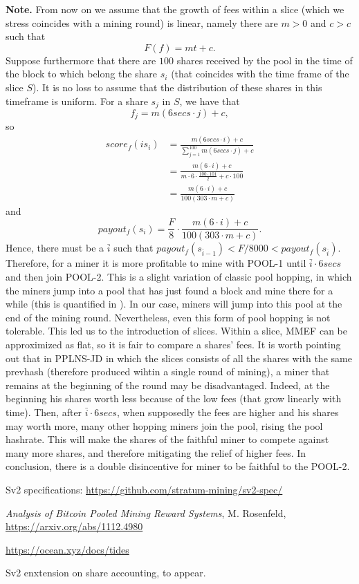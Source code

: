 \documentclass[11pt]{article} %
\begin{document}
\textbf{Note.} From now on we assume that the growth of fees within a slice (which we stress coincides with a mining round) is linear, namely there are $m>0$ and $c>c$ such that 
\[F(f) = mt+c.\]
Suppose furthermore that there are $100$ shares received by the pool in the time of the block to which belong the share $s_i$ (that coincides with the time frame of the slice $S$). It is no loss to assume that the distribution of these shares in this timeframe is uniform. For a share $s_j$ in $S$, we have that 
\[ f_j = m(6secs \cdot j) +c,\]
so
\begin{align*}
	score_f(is_i) &= \frac{m(6secs\cdot i) +c}{\sum_{j=1}^{100} m(6secs\cdot j) +c}\\
	&= \frac{m(6\cdot i) +c}{m\cdot 6\cdot\frac{100\cdot101}{2} +c\cdot 100}\\
	&= \frac{m(6\cdot i) +c}{100(303\cdot m +c)}
\end{align*}
and 
\[payout_f(s_i) = \frac{F}{8} \cdot \frac{m(6\cdot i) +c}{100(303\cdot m +c)}.\]
Hence, there must be a $\bar i$ such that $payout_f(s_{\bar i -1})< F/8000<payout_f(s_{\bar i })$.
Therefore, for a miner it is more profitable to mine with POOL-1 until $\bar i \cdot 6 secs$ and then join POOL-2. This is a slight variation of classic pool hopping, in which the miners jump into a pool that has just found a block and mine there for a while (this is quantified in \cite{rosenfeld}). In our case, miners will jump into this pool at the end of the mining round. Nevertheless, even this form of pool hopping is not tolerable. This led us to the introduction of slices. Within a slice, MMEF can be approximized as flat, so it is fair to compare a shares' fees.
It is worth pointing out that in PPLNS-JD in which the slices consists of all the shares with the same prevhash (therefore produced wihtin a single round of mining), a miner that remains at the beginning of the round may be disadvantaged. Indeed, at the beginning his shares worth less because of the low fees (that grow linearly with time). Then, after $\bar i \cdot 6 secs$, when supposedly the fees are higher and his shares may worth more, many other hopping miners join the pool, rising the pool hashrate. This will make the shares of the faithful miner to compete against many more shares, and therefore mitigating the relief of higher fees. In conclusion, there is a double disincentive for miner to be faithful to the POOL-2.

\begin{thebibliography}{9}

Sv2 specifications: \url{https://github.com/stratum-mining/sv2-spec/}

\emph{Analysis of Bitcoin Pooled Mining Reward Systems}, M. Rosenfeld, \url{https://arxiv.org/abs/1112.4980}

\url{https://ocean.xyz/docs/tides}

Sv2 enxtension on share accounting, to appear.

\end{thebibliography}
\end{document}
